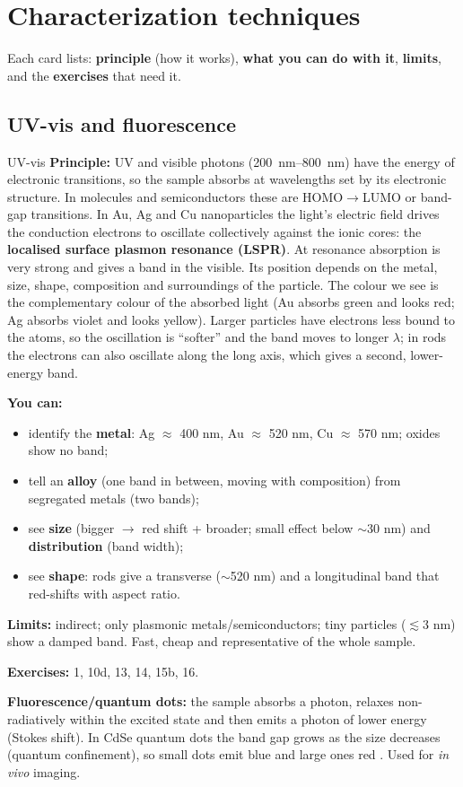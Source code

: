 \section{Characterization techniques}
\label{sec:techniques}
Each card lists: \textbf{principle} (how it works), \textbf{what you can do with it}, \textbf{limits}, and the \textbf{exercises}
that need it.

\newcommand{\tech}[5]{%
\begin{cardbox}{#1}
\textbf{Principle:} #2\par\smallskip
\textbf{You can:} #3\par
\textbf{Limits:} #4\par
\textbf{Exercises:} #5
\end{cardbox}}

\subsection{UV-vis and fluorescence}
\tech{UV-vis }
{UV and visible photons (\SIrange{200}{800}{nm}) have the energy of electronic transitions, so the sample absorbs at wavelengths
set by its electronic structure. In molecules and semiconductors these are HOMO$\to$LUMO or band-gap transitions. In Au, Ag and Cu
nanoparticles the light's electric field drives the conduction electrons to oscillate collectively against the ionic cores: the
\textbf{localised surface plasmon resonance (LSPR)}. At resonance absorption is very strong and gives a band in the visible. Its
position depends on the metal, size, shape, composition and surroundings of the particle. The colour we see is the complementary
colour of the absorbed light (Au absorbs green and looks red; Ag absorbs violet and looks yellow). Larger particles have electrons
less bound to the atoms, so the oscillation is ``softer'' and the band moves to longer $\lambda$; in rods the electrons can also
oscillate along the long axis, which gives a second, lower-energy band.}
{\begin{itemize}
 \item identify the \textbf{metal}: Ag $\approx$ 400 nm, Au $\approx$ 520 nm, Cu $\approx$ 570 nm; oxides show no band;
 \item tell an \textbf{alloy} (one band in between, moving with composition) from segregated metals (two bands);
 \item see \textbf{size} (bigger $\to$ red shift + broader; small effect below $\sim$30 nm) and \textbf{distribution} (band width);
 \item see \textbf{shape}: rods give a transverse ($\sim$520 nm) and a longitudinal band that red-shifts with aspect ratio.
\end{itemize}}
{indirect; only plasmonic metals/semiconductors; tiny particles ($\lesssim$3 nm) show a damped band. Fast, cheap and
representative of the whole sample.}
{1, 10d, 13, 14, 15b, 16.}
\textbf{Fluorescence/quantum dots:} the sample absorbs a photon, relaxes non-radiatively within the excited state and then emits a
photon of lower energy (Stokes shift). In CdSe quantum dots the band gap grows as the size decreases (quantum confinement), so small
dots emit blue and large ones red . Used for \emph{in vivo} imaging.

